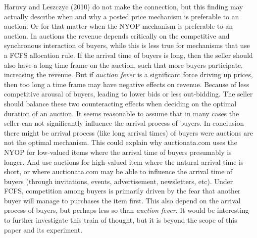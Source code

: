 \documentclass[a4paper,12pt]{article}
\begin{document}
	Haruvy and Leszczyc (2010) do not make the connection, but this finding may actually describe when and why a posted price mechanism is preferable to an auction. Or for that matter when the NYOP mechanism is preferable to an auction. In auctions the revenue depends critically on the competitive and synchronous interaction of buyers, while this is less true for mechanisms that use a FCFS allocation rule. If the arrival time of buyers is long, then the seller should also have a long time frame on the auction, such that more buyers participate, increasing the revenue. But if \emph{auction fever} is a significant force driving up prices, then too long a time frame may have negative effects on revenue. Because of less competitive arousal of buyers, leading to lower bids or less out-bidding. The seller should balance these two counteracting effects when deciding on the optimal duration of an auction. It seems reasonable to assume that in many cases the seller can not significantly influence the arrival process of buyers. In conclusion there might be arrival process (like long arrival times) of buyers were auctions are not the optimal mechanism. This could explain why auctionata.com uses the NYOP for low-valued items where the arrival time of buyers presumably is longer. And use auctions for high-valued item where the natural arrival time is short, or where auctionata.com may be able to influence the arrival time of buyers (through invitations, events, advertisement, newsletters, etc). Under FCFS, competition among buyers is primarily driven by the fear that another buyer will manage to purchases the item first. This also depend on the arrival process of buyers, but perhaps less so than \emph{auction fever}. It would be interesting to further investigate this train of thought, but it is beyond the scope of this paper and its experiment.


\end{document}
